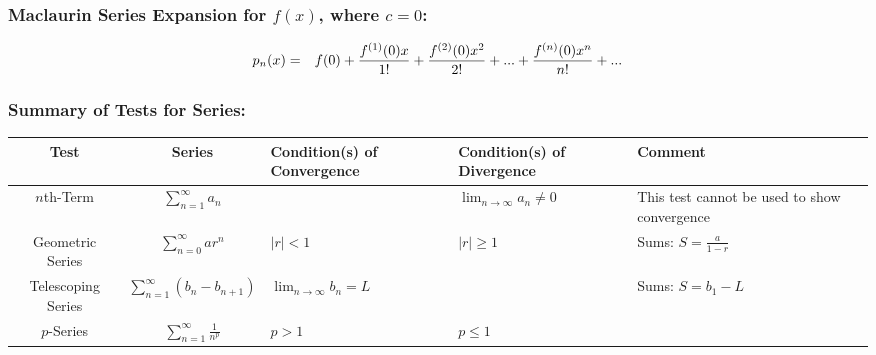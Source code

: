 \documentclass{article}[11pt]
\begin{document}
\subsubsection*{\large{Maclaurin Series Expansion for $f(x)$, where $c=0$:}}
\begin{eqnarray*}
\vspace{-0.05in}
p_n(x) &=& f(0) + \frac{f^{(1)}(0)x}{1!} + \frac{f^{(2)}(0)x^2}{2!} + ... + \frac{f^{(n)}(0)x^n}{n!} + ... 
\end{eqnarray*}

\pagebreak

\subsubsection*{\large{Summary of Tests for Series:}}
\begin{table}[h]
\begin{center}
\begin{tabular}{|c|c|p{1in}|p{1in}|p{2in}|}
\hline
Test & Series & Condition(s) of Convergence & Condition(s) of Divergence & Comment \\ \hline
$n$th-Term & $\displaystyle{\sum^\infty_{n=1}{a_n}}$ &  & $\displaystyle{\lim_{n \to \infty} a_n \neq 0}$ & This test cannot be used to show convergence\\ \hline

Geometric Series & $\displaystyle{\sum^\infty_{n=0}{a r^n}}$ & $ \left| r \right| < 1$ & $\left| r \right| \geq 1$ & Sums: $\displaystyle{S = \frac{a}{1-r}}$ \\ \hline

Telescoping Series & $\displaystyle{\sum^\infty_{n=1}{(b_n-b_{n+1})}}$ & $\displaystyle{\lim_{n \to \infty} b_n = L}$ & & Sums: $S= b_1 -L$ \\ \hline

$p$-Series & $\displaystyle{\sum^\infty_{n=1}{\frac{1}{n^p}}}$ & $p>1$ & $p\leq 1$ & \\ \hline

\end{tabular}
\end{center}
\end{table}
\end{document}
